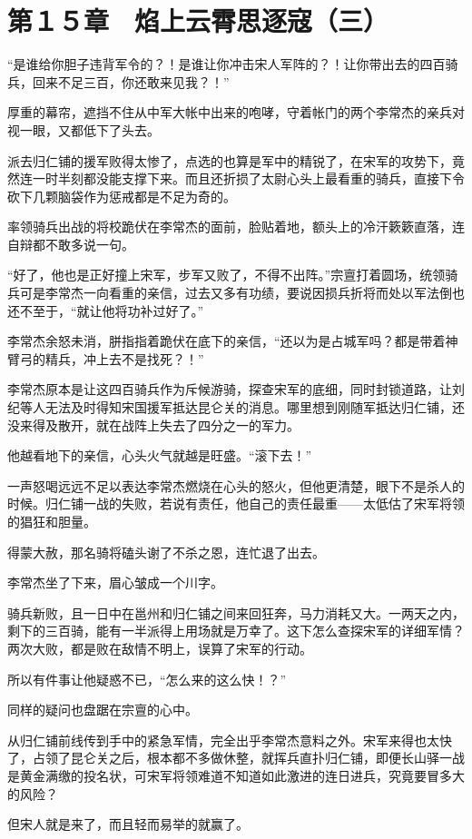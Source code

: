 \section{第１５章　焰上云霄思逐寇（三）}

“是谁给你胆子违背军令的？！是谁让你冲击宋人军阵的？！让你带出去的四百骑兵，回来不足三百，你还敢来见我？！”

厚重的幕帘，遮挡不住从中军大帐中出来的咆哮，守着帐门的两个李常杰的亲兵对视一眼，又都低下了头去。

派去归仁铺的援军败得太惨了，点选的也算是军中的精锐了，在宋军的攻势下，竟然连一时半刻都没能支撑下来。而且还折损了太尉心头上最看重的骑兵，直接下令砍下几颗脑袋作为惩戒都是不足为奇的。

率领骑兵出战的将校跪伏在李常杰的面前，脸贴着地，额头上的冷汗簌簌直落，连自辩都不敢多说一句。

“好了，他也是正好撞上宋军，步军又败了，不得不出阵。”宗亶打着圆场，统领骑兵可是李常杰一向看重的亲信，过去又多有功绩，要说因损兵折将而处以军法倒也还不至于，“就让他将功补过好了。”

李常杰余怒未消，胼指指着跪伏在底下的亲信，“还以为是占城军吗？都是带着神臂弓的精兵，冲上去不是找死？！”

李常杰原本是让这四百骑兵作为斥候游骑，探查宋军的底细，同时封锁道路，让刘纪等人无法及时得知宋国援军抵达昆仑关的消息。哪里想到刚随军抵达归仁铺，还没来得及散开，就在战阵上失去了四分之一的军力。

他越看地下的亲信，心头火气就越是旺盛。“滚下去！”

一声怒喝远远不足以表达李常杰燃烧在心头的怒火，但他更清楚，眼下不是杀人的时候。归仁铺一战的失败，若说有责任，他自己的责任最重——太低估了宋军将领的猖狂和胆量。

得蒙大赦，那名骑将磕头谢了不杀之恩，连忙退了出去。

李常杰坐了下来，眉心皱成一个川字。

骑兵新败，且一日中在邕州和归仁铺之间来回狂奔，马力消耗又大。一两天之内，剩下的三百骑，能有一半派得上用场就是万幸了。这下怎么查探宋军的详细军情？两次大败，都是败在敌情不明上，误算了宋军的行动。

所以有件事让他疑惑不已，“怎么来的这么快！？”

同样的疑问也盘踞在宗亶的心中。

从归仁铺前线传到手中的紧急军情，完全出乎李常杰意料之外。宋军来得也太快了，占领了昆仑关之后，根本都不多做休整，就挥兵直扑归仁铺，即便长山驿一战是黄金满缴的投名状，可宋军将领难道不知道如此激进的连日进兵，究竟要冒多大的风险？

但宋人就是来了，而且轻而易举的就赢了。

